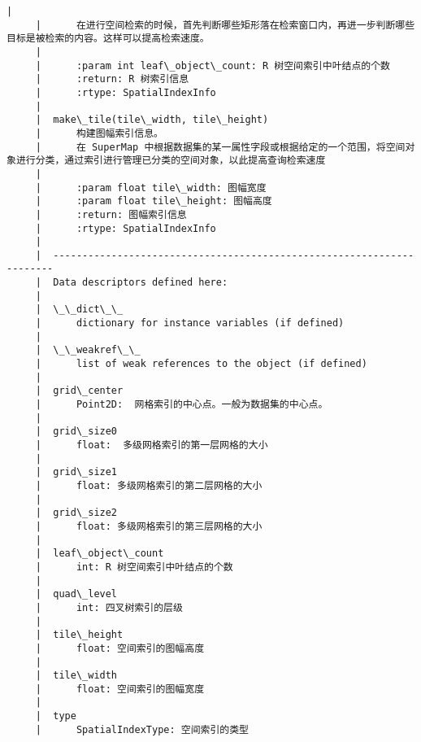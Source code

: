 \documentclass[11pt]{article}
\begin{document}
\begin{Verbatim}[commandchars=\\\{\}]
     |      
     |      在进行空间检索的时候，首先判断哪些矩形落在检索窗口内，再进一步判断哪些目标是被检索的内容。这样可以提高检索速度。
     |      
     |      :param int leaf\_object\_count: R 树空间索引中叶结点的个数
     |      :return: R 树索引信息
     |      :rtype: SpatialIndexInfo
     |  
     |  make\_tile(tile\_width, tile\_height)
     |      构建图幅索引信息。
     |      在 SuperMap 中根据数据集的某一属性字段或根据给定的一个范围，将空间对象进行分类，通过索引进行管理已分类的空间对象，以此提高查询检索速度
     |      
     |      :param float tile\_width: 图幅宽度
     |      :param float tile\_height: 图幅高度
     |      :return: 图幅索引信息
     |      :rtype: SpatialIndexInfo
     |  
     |  ----------------------------------------------------------------------
     |  Data descriptors defined here:
     |  
     |  \_\_dict\_\_
     |      dictionary for instance variables (if defined)
     |  
     |  \_\_weakref\_\_
     |      list of weak references to the object (if defined)
     |  
     |  grid\_center
     |      Point2D:  网格索引的中心点。一般为数据集的中心点。
     |  
     |  grid\_size0
     |      float:  多级网格索引的第一层网格的大小
     |  
     |  grid\_size1
     |      float: 多级网格索引的第二层网格的大小
     |  
     |  grid\_size2
     |      float: 多级网格索引的第三层网格的大小
     |  
     |  leaf\_object\_count
     |      int: R 树空间索引中叶结点的个数
     |  
     |  quad\_level
     |      int: 四叉树索引的层级
     |  
     |  tile\_height
     |      float: 空间索引的图幅高度
     |  
     |  tile\_width
     |      float: 空间索引的图幅宽度
     |  
     |  type
     |      SpatialIndexType: 空间索引的类型
    

\end{Verbatim}
\end{document}
